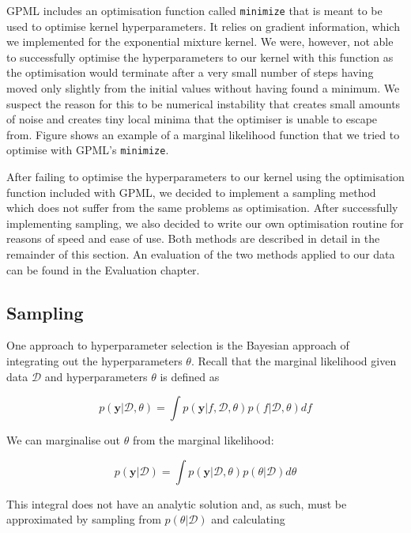 \documentclass[a4paper,12pt,twoside,openright]{report}
\begin{document}
GPML includes an optimisation function called \texttt{minimize} that is meant to be used to optimise kernel hyperparameters. It relies on gradient information, which we implemented for the exponential mixture kernel. We were, however, not able to successfully optimise the hyperparameters to our kernel with this function as the optimisation would terminate after a very small number of steps having moved only slightly from the initial values without having found a minimum. We suspect the reason for this to be numerical instability that creates small amounts of noise and creates tiny local minima that the optimiser is unable to escape from. Figure  shows an example of a marginal likelihood function that we tried to optimise with GPML's \texttt{minimize}.

After failing to optimise the hyperparameters to our kernel using the optimisation function included with GPML, we decided to implement a sampling method which does not suffer from the same problems as optimisation. After successfully implementing sampling, we also decided to write our own optimisation routine for reasons of speed and ease of use. Both methods are described in detail in the remainder of this section. An evaluation of the two methods applied to our data can be found in the Evaluation chapter.

\subsection{Sampling}
One approach to hyperparameter selection is the Bayesian approach of integrating out the hyperparameters $\theta$. Recall that the marginal likelihood given data $\mathcal{D}$ and hyperparameters $\theta$ is defined as

\begin{equation}
p(\mathbf{y}|\mathcal{D}, \theta) = \int p(\mathbf{y}|f, \mathcal{D}, \theta)p(f|\mathcal{D}, \theta) df
\end{equation}

We can marginalise out $\theta$ from the marginal likelihood:

\begin{equation}
p(\mathbf{y}|\mathcal{D}) = \int p(\mathbf{y}|\mathcal{D}, \theta)p(\theta|\mathcal{D}) d\theta
\end{equation}

This integral does not have an analytic solution and, as such, must be approximated by sampling from $p(\theta|\mathcal{D})$ and calculating
\end{document}
